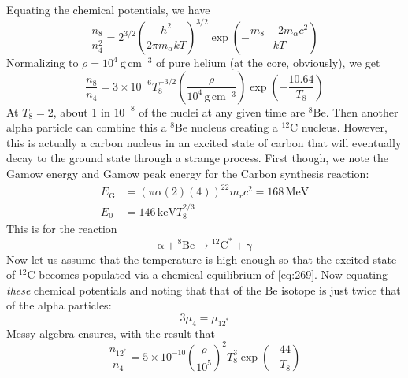 \documentclass[10pt]{article}
\numberwithin{equation}{section}
\newcommand{\n}{\noindent}
\begin{document}
    \n Equating the chemical potentials, we have
    \begin{equation}
      \label{eq:266}
      \frac{n_8}{n_4^2}=2^{3/2}\left(\frac{h^2}{2\pi m_\alpha
          kT}\right)^{3/2}\exp\left(-\frac{m_8-2m_\alpha c^2}{kT}\right)
    \end{equation}
    Normalizing to $\rho=10^4\ \mathrm{g\,cm^{-3}}$ of pure helium (at
    the core, obviously), we get
    \begin{equation}
      \label{eq:267}
      \frac{n_8}{n_4}=3\times
      10^{-6}T_8^{-3/2}\left(\frac{\rho}{10^4\,\mathrm{g\,cm^{-3}}}\right)
\exp\left(-\frac{10.64}{T_8}\right) 
    \end{equation}
    At $T_8=2$, about 1 in $10^{-8}$ of the nuclei at any given time
    are ${}^8\mathrm{Be}$. Then another alpha particle can combine
    this a ${}^8\mathrm{Be}$ nucleus creating a ${}^{12}\mathrm{C}$
    nucleus. However, this is actually a carbon nucleus in an excited
    state of carbon that will eventually decay to the ground state
    through a strange process. First though, we note the Gamow energy
    and Gamow peak energy for the Carbon synthesis reaction:
    \begin{align}
      \label{eq:268}
      E_\mathrm{G}&=\left(\pi\alpha(2)(4)\right)^22m_rc^2=168\,\mathrm{MeV}
\\
      \label{eq:268a}
      E_0&=146\,\mathrm{keV}T_8^{2/3}
    \end{align}
    This is for the reaction
    \begin{equation}
      \label{eq:269}
      \mathrm{\alpha+{}^8Be\to{}^{12}C^*+\gamma}
    \end{equation}
    Now let us assume that the temperature is high enough so that the
    excited state of ${}^{12}\mathrm{C}$ becomes populated via a
    chemical equilibrium of \eqref{eq:269}. Now equating
    \textit{these} chemical potentials and noting that that of the Be
    isotope is just twice that of the alpha particles:
    \begin{equation}
      \label{eq:270}
      3\mu_4=\mu_{12^*}
    \end{equation}
    Messy algebra ensures, with the result that
    \begin{equation}
      \label{eq:271}
      \frac{n_{\mathrm{12^*}}}{n_4}=5\times
      10^{-10}\left(\frac{\rho}{10^5}\right)^2T_8^3\exp\left(-\frac{44}
{T_8}\right)
    \end{equation}
\end{document}

